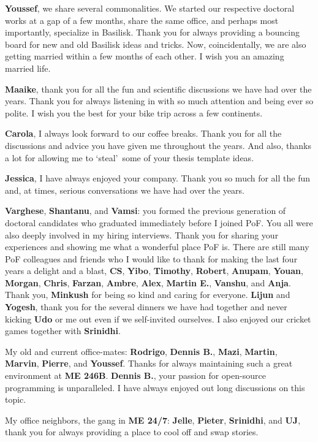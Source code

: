 {\bf Youssef}, we share several commonalities. We started our respective doctoral works at a gap of a few months, share the same office, and perhaps most importantly, specialize in Basilisk. Thank you for always providing a bouncing board for new and old Basilisk ideas and tricks. Now, coincidentally, we are also getting married within a few months of each other. I wish you an amazing married life. 

{\bf Maaike}, thank you for all the fun and scientific discussions we have had over the years. Thank you for always listening in with so much attention and being ever so polite. I wish you the best for your bike trip across a few continents.

{\bf Carola}, I always look forward to our coffee breaks. Thank you for all the discussions and advice you have given me throughout the years. And also, thanks a lot for allowing me to \lq steal\rq\, some of your thesis template ideas. 

{\bf Jessica}, I have always enjoyed your company. Thank you so much for all the fun and, at times, serious conversations we have had over the years.

{\bf Varghese}, {\bf Shantanu}, and {\bf Vamsi}: you formed the previous generation of doctoral candidates who graduated immediately before I joined PoF. You all were also deeply involved in my hiring interviews. Thank you for sharing your experiences and showing me what a wonderful place PoF is. There are still many PoF colleagues and friends who I would like to thank for making the last four years a delight and a blast, {\bf CS}, {\bf Yibo}, {\bf Timothy}, {\bf Robert}, {\bf Anupam}, {\bf Youan}, {\bf Morgan}, {\bf Chris}, {\bf Farzan}, {\bf Ambre}, {\bf Alex}, {\bf Martin E.}, {\bf Vanshu}, and {\bf Anja}. Thank you, {\bf Minkush} for being so kind and caring for everyone. {\bf Lijun} and {\bf Yogesh}, thank you for the several dinners we have had together and never kicking {\bf Udo} or me out even if we self-invited ourselves. I also enjoyed our cricket games together with {\bf Srinidhi}. 

My old and current office-mates: {\bf Rodrigo}, {\bf Dennis B.}, {\bf Mazi}, {\bf Martin}, {\bf Marvin}, {\bf Pierre}, and {\bf Youssef}. Thanks for always maintaining such a great environment at {\bf ME 246B}. {\bf Dennis B.}, your passion for open-source programming is unparalleled. I have always enjoyed out long discussions on this topic. 

My office neighbors, the gang in {\bf ME 24/7}: {\bf Jelle}, {\bf Pieter}, {\bf Srinidhi}, and {\bf UJ}, thank you for always providing a place to cool off and swap stories. 

